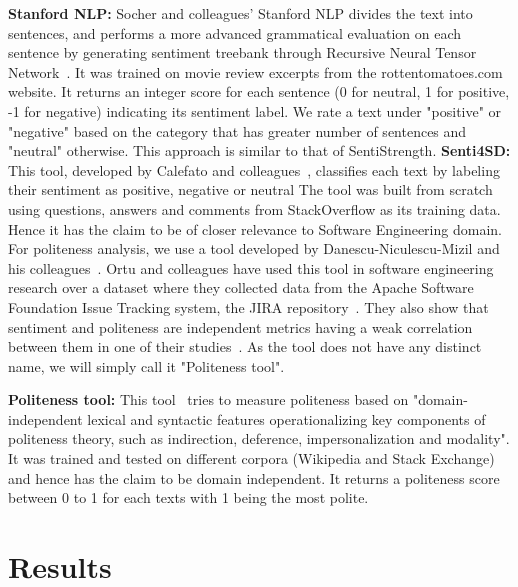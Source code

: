 \newline
\indent\textbf{Stanford NLP:} Socher and colleagues' Stanford NLP 
divides the text into sentences, 
and performs a more advanced grammatical evaluation 
on each sentence 
by generating sentiment treebank 
through Recursive Neural Tensor Network~\cite{socher2013recursive}.
It was trained on movie review excerpts 
from the rottentomatoes.com website. 
It returns an integer score for each sentence (0 for neutral, 1 for positive, -1 for negative) indicating its sentiment label. We rate a text under "positive" or "negative" based on the category that has greater number of sentences and "neutral" otherwise. This approach is similar to that of SentiStrength.
\newline
\indent\textbf{Senti4SD:} This tool, 
developed by Calefato and colleagues~\cite{calefato2017sentiment}, classifies each text by labeling their sentiment 
as positive, negative or neutral 
The tool was built
from scratch using 
questions, answers and comments 
from StackOverflow as its training data. 
Hence it has the claim to be of closer relevance to Software Engineering domain.
\newline
\newline
For politeness analysis, we use a tool developed by Danescu-Nicu\-lescu-Mizil and his colleagues~\cite{danescu2013computational}. Ortu and colleagues have used this tool in software engineering research over a dataset where they collected data from the Apache Software Foundation Issue Tracking system, the JIRA repository~\cite{ortu2015would,ortu2015bullies}. They also show that sentiment and politeness are independent metrics having a weak correlation between them in one of their studies~\cite{ortu2015bullies}. As the tool does not have any distinct name, we will simply call it "Politeness tool". 

\textbf{Politeness tool:} This tool~\cite{danescu2013computational} tries to measure politeness based on "domain-independent lexical and syntactic features operationalizing key components of politeness theory, such as indirection, deference, impersonalization and modality". 
It was trained and tested 
on different corpora (Wikipedia and Stack Exchange) 
and hence has the claim to be domain independent. 
It returns a politeness score between 0 to 1 for each texts with 1 being the most polite.  

 
\section{Results}

